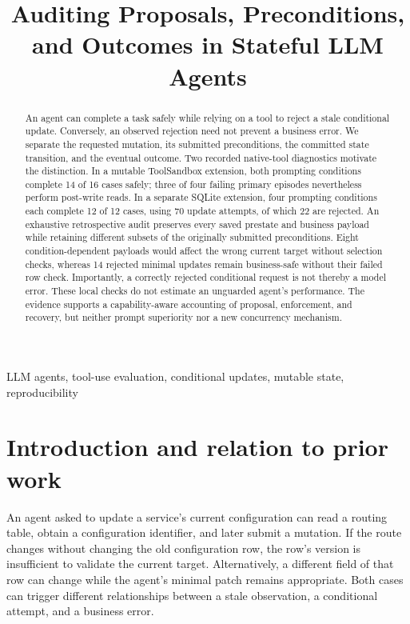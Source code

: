 \documentclass[10pt,letterpaper]{article}
\title{Auditing Proposals, Preconditions, and Outcomes in Stateful LLM Agents}
\begin{document}
\maketitle
\begin{abstract}
An agent can complete a task safely while relying on a tool to reject a stale conditional update. Conversely, an observed rejection need not prevent a business error. We separate the requested mutation, its submitted preconditions, the committed state transition, and the eventual outcome. Two recorded native-tool diagnostics motivate the distinction. In a mutable ToolSandbox extension, both prompting conditions complete 14 of 16 cases safely; three of four failing primary episodes nevertheless perform post-write reads. In a separate SQLite extension, four prompting conditions each complete 12 of 12 cases, using 70 update attempts, of which 22 are rejected. An exhaustive retrospective audit preserves every saved prestate and business payload while retaining different subsets of the originally submitted preconditions. Eight condition-dependent payloads would affect the wrong current target without selection checks, whereas 14 rejected minimal updates remain business-safe without their failed row check. Importantly, a correctly rejected conditional request is not thereby a model error. These local checks do not estimate an unguarded agent's performance. The evidence supports a capability-aware accounting of proposal, enforcement, and recovery, but neither prompt superiority nor a new concurrency mechanism.
\end{abstract}
\begin{keywords}
LLM agents, tool-use evaluation, conditional updates, mutable state, reproducibility
\end{keywords}

\section{Introduction and relation to prior work}
An agent asked to update a service's current configuration can read a routing table, obtain a configuration identifier, and later submit a mutation. If the route changes without changing the old configuration row, the row's version is insufficient to validate the current target. Alternatively, a different field of that row can change while the agent's minimal patch remains appropriate. Both cases can trigger different relationships between a stale observation, a conditional attempt, and a business error.
\end{document}
